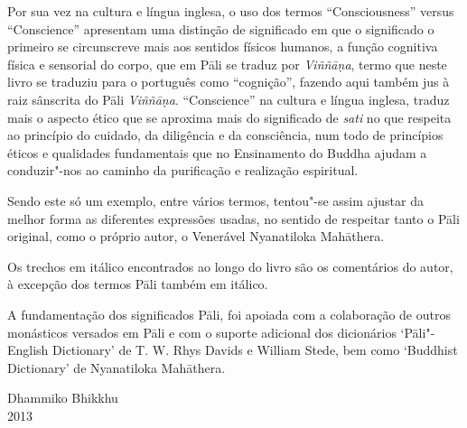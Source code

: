Por sua vez na cultura e língua inglesa, o uso dos termos “Consciousness”
versus “Conscience” apresentam uma distinção de significado em que o
significado o primeiro se circunscreve mais aos sentidos físicos humanos, a
função cognitiva física e sensorial do corpo, que em Pāli se traduz por
\emph{Viññāṇa}, termo que neste livro se traduziu para o português como
“cognição”, fazendo aqui também jus à raiz sânscrita do Pāli \emph{Viññāṇa}.
“Conscience” na cultura e língua inglesa, traduz mais o aspecto ético que se
aproxima mais do significado de \emph{sati} no que respeita ao princípio do
cuidado, da diligência e da consciência, num todo de princípios éticos e
qualidades fundamentais que no Ensinamento do Buddha ajudam a conduzir"-nos ao
caminho da purificação e realização espiritual.

Sendo este só um exemplo, entre vários termos, tentou"-se assim ajustar da melhor
forma as diferentes expressões usadas, no sentido de respeitar tanto o Pāli
original, como o próprio autor, o Venerável Nyanatiloka Mahāthera.

Os trechos em itálico encontrados ao longo do livro são os comentários do autor,
à excepção dos termos Pāli também em itálico.

A fundamentação dos significados Pāli, foi apoiada com a colaboração de outros
monásticos versados em Pāli e com o suporte adicional dos dicionários
‘Pāli"-English Dictionary’ de T. W. Rhys Davids e William Stede, bem como
‘Buddhist Dictionary’ de Nyanatiloka Mahāthera.

\bigskip

{\raggedleft
  Dhammiko Bhikkhu\\
  2013
\par}
